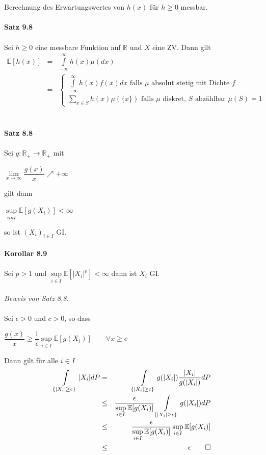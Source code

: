 \documentclass[10pt,a4paper]{report}
\newcommand{\E}{\mathbb{E}}
\newcommand{\R}{\mathbb{R}}
\numberwithin{equation}{section}
\numberwithin{figure}{section}
\theoremstyle{plain}
\theoremstyle{definition}
\theoremstyle{plain}
\theoremstyle{definition}
\theoremstyle{remark}
\theoremstyle{plain}
\theoremstyle{plain}
\theoremstyle{plain}
\newcommand{\1}{ \mathbb{1} } %
\begin{document}
$ $\\\\
Berechnung des Erwartungswertes von $h(x)$ für $h \geq 0$ messbar.\\\\
\textbf{Satz 9.8}\\\\
Sei $h\geq 0$ eine messbare Funktion auf $\R$ und $X$ eine ZV. Dann gilt
\begin{eqnarray*}
\E[h(x)] &=& \int\limits_{-\infty}^{\infty} h(x) \mu(dx)\\
&=& \begin{cases}
\int\limits_{-\infty}^\infty h(x)f(x) dx \text{ falls } \mu \text{ absolut stetig mit Dichte } f\\
\sum\limits_{x \in S} h(x)\mu(\{x\}) \text{ falls } \mu \text{ diskret, } S \text{ abzählbar } \mu(S)=1
\end{cases}
\end{eqnarray*}
\\\\
\textbf{Satz 8.8}\\\\
Sei $g:\R_+ \to \R_+$ mit
\begin{center}
$\lim\limits_{x\to \infty} \dfrac{g(x)}{x}\nearrow +\infty$
\end{center}
gilt dann
\begin{center}
$\sup\limits_{i in I} \E[g(X_i)]<\infty$
\end{center}
so ist $(X_i)_{i \in I}$ GI.\\\\
\textbf{Korollar 8.9}\\\\
Sei $p>1$ und $\sup\limits_{i \in I}\E[|X_i|^p]<\infty$ dann ist $X_i$ GI.\\\\
\textit{Beweis von Satz 8.8.}\\\\
Sei $\epsilon > 0$ und $c>0$, so dass 
\begin{center}
$\dfrac{g(x)}{x}\geq \dfrac{1}{\epsilon} \sup\limits_{i \in I}\E[g(X_i)] \qquad \forall x \geq c$
\end{center}
Dann gilt für alle $i \in I$
\begin{eqnarray*}
\int\limits_{\{|X_i|\geq c\}} |X_i|dP &=& \int\limits_{\{|X_i|\geq c\}} g(|X_i|)\dfrac{|X_i|}{g(|X_i|)} dP\\
&\leq &\dfrac{\epsilon}{\sup\limits_{i \in I}\E[g(X_i)]}\int\limits_{\{|X_i|\geq c\}} g(|X_i|)dP\\
&\leq & \dfrac{\epsilon}{\sup\limits_{i \in I}\E[g(X_i)]}\sup\limits_{i \in I}\E[g(X_i)]\\
&\leq & \epsilon \qed
\end{eqnarray*}
\end{document}
